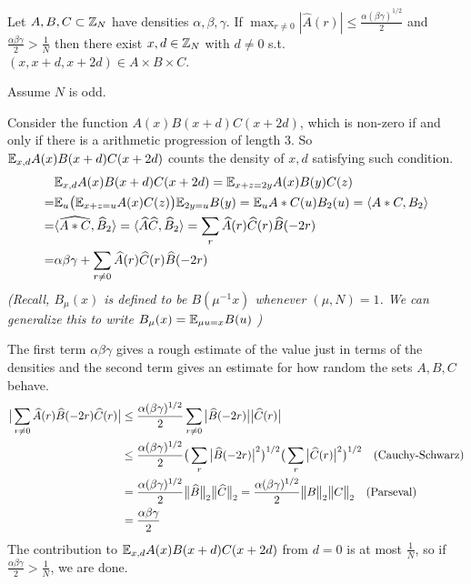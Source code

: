 \documentclass[10pt,a4paper]{report}
\renewcommand{\hat}{\widehat}
\newenvironment{proof}
{\begin{changemargin}{1cm}{0.5cm}
	}%
	{\end{changemargin}
}
\begin{document}
 Let $A,B,C \subset \mathbb{Z}_N$ have densities $\alpha,\beta,\gamma$. If $\max_{r\neq 0} |\hat{A}(r)| \leq \frac{\alpha(\beta \gamma)^{1/2}}{2}$ and $\frac{\alpha \beta \gamma}{2} > \frac{1}{N}$ then there exist $x, d \in \mathbb{Z}_N$ with $d\neq 0$ s.t. $(x,x+d,x+2d) \in A \times B \times C$.
\begin{proof}
\pf Assume $N$ is odd.

Consider the function $A(x)B(x+d)C(x+2d)$, which is non-zero if and only if there is a arithmetic progression of length 3. So $\mathbb{E}_{x,d} A(x)B(x+d)C(x+2d)$ counts the density of $x,d$ satisfying such condition.
\begin{align*}
& \avg_{x,d}A(x)B(x+d)C(x+2d) = \avg_{x+z =2y}A(x)B(y)C(z) \\
=& \avg_{u}\big( \avg_{x+z =u} A(x)C(z) \big) \avg_{2y=u} B(y) = \avg_u A * C(u) B_2(u) = \langle A * C, B_2 \rangle \\
=& \langle \hat{A*C}, \hat{B}_2 \rangle = \langle \hat{A} \hat{C}, \hat{B}_2 \rangle = \sum_r \hat{A}(r) \hat{C}(r) \hat{B}(-2r) \\
=& \alpha \beta \gamma + \sum_{r\neq 0} \hat{A}(r) \hat{C}(r) \hat{B}(-2r)
\end{align*}
\textit{(Recall, $B_{\mu}(x)$ is defined to be $B(\mu^{-1}x)$ whenever $(\mu, N)=1$. We can generalize this to write $B_{\mu}(x) = \mathbb{E}_{\mu u=x}B(u)$  )}

The first term $\alpha \beta \gamma$ gives a rough estimate of the value just in terms of the densities and the second term gives an estimate for how random the sets $A,B,C$ behave.
\begin{align*}
\big|\sum_{r\neq 0} \hat{A}(r) \hat{B}(-2r) \hat{C}(r) \big| &\leq \frac{\alpha (\beta \gamma)^{1/2}}{2} \sum_{r\neq 0} \big|\hat{B}(-2r)\big| \big|\hat{C}(r)\big| \\
&\leq \frac{\alpha (\beta \gamma)^{1/2}}{2} \big( \sum_r \big| \hat{B}(-2r) \big|^2 \big)^{1/2} \big( \sum_r \big| \hat{C}(r) \big|^2 \big)^{1/2} \quad \text{(Cauchy-Schwarz)} \\
& = \frac{\alpha (\beta \gamma)^{1/2}}{2} \norms{\hat{B}}{2} \norms{\hat{C}}{2} = \frac{\alpha (\beta \gamma)^{1/2}}{2} \norms{B}{2} \norms{C}{2} \quad \text{(Parseval)} \\
& = \frac{\alpha \beta \gamma}{2}
\end{align*}
The contribution to $\mathbb{E}_{x,d}A(x)B(x+d)C(x+2d)$ from $d=0$ is at most $\frac{1}{N}$, so if $\frac{\alpha \beta \gamma}{2} > \frac{1}{N}$, we are done.

\eop
\end{proof}
\s
\end{document}
